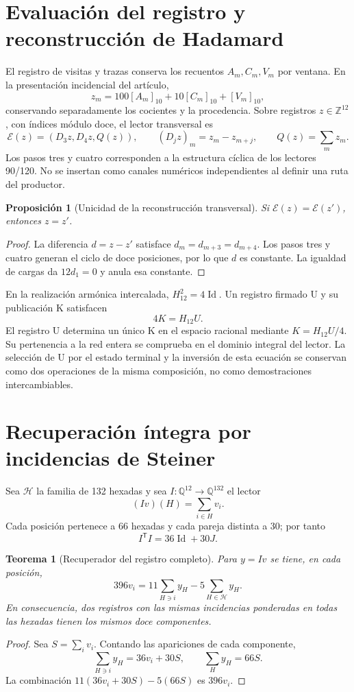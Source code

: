 \documentclass[11pt,a4paper]{article}
\newtheorem{proposition}{Proposición}
\newtheorem{theorem}{Teorema}
\newcommand{\Z}{\mathbb Z}
\newcommand{\Q}{\mathbb Q}
\begin{document}
\section{Evaluación del registro y reconstrucción de Hadamard}

El registro de visitas y trazas conserva los recuentos $A_m,C_m,V_m$ por
ventana. En la presentación incidencial del artículo,
\[
 z_m=100[A_m]_{10}+10[C_m]_{10}+[V_m]_{10},
\]
conservando separadamente los cocientes y la procedencia. Sobre registros
$z\in\Z^{12}$, con índices módulo doce, el lector transversal es
\[
 \mathcal E(z)=(D_3z,D_4z,Q(z)),\qquad
 (D_jz)_m=z_m-z_{m+j},\qquad Q(z)=\sum_mz_m.
\]
Los pasos tres y cuatro corresponden a la estructura cíclica de los lectores
90/120. No se insertan como canales numéricos independientes al definir una
ruta del productor.

\begin{proposition}[Unicidad de la reconstrucción transversal]
Si $\mathcal E(z)=\mathcal E(z')$, entonces $z=z'$.
\end{proposition}
\begin{proof}
La diferencia $d=z-z'$ satisface $d_m=d_{m+3}=d_{m+4}$. Los pasos tres y
cuatro generan el ciclo de doce posiciones, por lo que $d$ es constante.
La igualdad de cargas da $12d_1=0$ y anula esa constante.
\end{proof}

En la realización armónica intercalada, $H_{12}^2=4\operatorname{Id}$.
Un registro firmado U y su publicación K satisfacen
\[
 4K=H_{12}U.
\]
El registro U determina un único K en el espacio racional mediante
$K=H_{12}U/4$. Su pertenencia a la red entera se comprueba en el dominio
integral del lector. La selección de U por el estado terminal y la inversión
de esta ecuación se conservan como
dos operaciones de la misma composición, no como demostraciones
intercambiables.

\section{Recuperación íntegra por incidencias de Steiner}

Sea $\mathcal H$ la familia de 132 hexadas y sea
$I:\Q^{12}\longrightarrow\Q^{132}$ el lector
\[
 (Iv)(H)=\sum_{i\in H}v_i.
\]
Cada posición pertenece a 66 hexadas y cada pareja distinta a 30; por tanto
\[
 I^{\mathsf T}I=36\operatorname{Id}+30J.
\]
\begin{theorem}[Recuperador del registro completo]
Para $y=Iv$ se tiene, en cada posición,
\[
 \boxed{396v_i=11\sum_{H\ni i}y_H-5\sum_{H\in\mathcal H}y_H.}
\]
En consecuencia, dos registros con las mismas incidencias ponderadas en
todas las hexadas tienen los mismos doce componentes.
\end{theorem}
\begin{proof}
Sea $S=\sum_iv_i$. Contando las apariciones de cada componente,
\[
 \sum_{H\ni i}y_H=36v_i+30S,\qquad
 \sum_Hy_H=66S.
\]
La combinación $11(36v_i+30S)-5(66S)$ es $396v_i$.
\end{proof}
\end{document}

